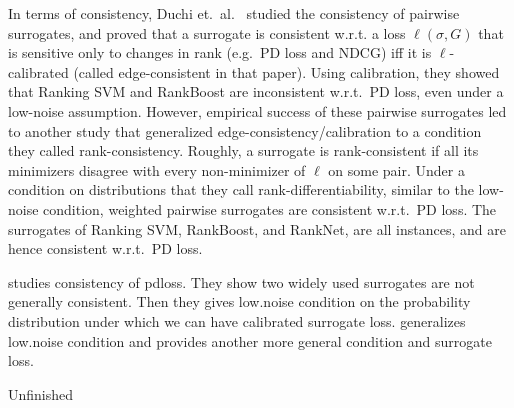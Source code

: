 In terms of consistency, Duchi et.\ al.~\cite{duchi2010ranking}
studied the consistency of pairwise
surrogates, and proved that a surrogate is consistent w.r.t. a
loss $\ell(\sigma, G)$ that is sensitive only to changes in rank
(e.g.\ PD loss and NDCG) iff it is $\ell$-calibrated (called edge-consistent
in that paper). Using calibration, they showed that Ranking SVM and RankBoost
are inconsistent w.r.t.\ PD loss, even under a low-noise assumption.
However, empirical success of these pairwise surrogates led to another study
that generalized edge-consistency/calibration to a condition they called
rank-consistency.
Roughly, a surrogate is rank-consistent if all its minimizers
disagree with every non-minimizer of $\ell$ on some pair. Under a condition
on distributions that they call rank-differentiability,
similar to the low-noise condition, weighted pairwise surrogates are consistent
w.r.t.\ PD loss. The surrogates of Ranking SVM, RankBoost, and RankNet, are
all instances, and are hence consistent w.r.t.\ PD loss.


\cite{duchi2010ranking} studies consistency of pdloss. They show two widely used surrogates are not generally consistent. Then they gives low.noise condition on the probability distribution under which we can have calibrated surrogate loss. \cite{ramaswamy2013convex} generalizes low.noise condition and provides another more general condition and surrogate loss. 

Unfinished


